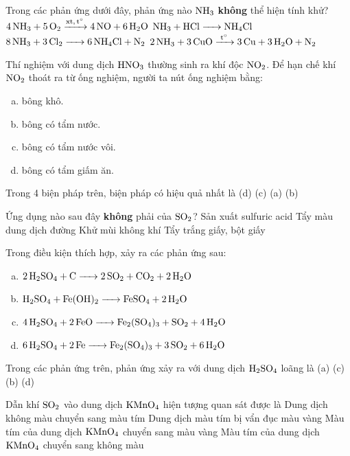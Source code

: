 \documentclass[12pt,a4paper]{article}
\begin{document}
\begin{ex}
Trong các phản ứng dưới đây, phản ứng nào $\ce{NH3}$ \textbf{không} thể hiện tính khử?
\choice
{$\ce{4NH3 + 5O2 ->[xt, t^\circ] 4NO + 6H2O}$}
{\True $\ce{NH3 + HCl -> NH4Cl}$}
{$\ce{8NH3 + 3Cl2 -> 6NH4Cl + N2}$}
{$\ce{2NH3 + 3CuO ->[t^\circ] 3Cu + 3H2O + N2}$}

\end{ex}

\begin{ex}
Thí nghiệm với dung dịch $\ce{HNO3}$ thường sinh ra khí độc $\ce{NO2}$. Để hạn chế khí $\ce{NO2}$ thoát ra từ ống nghiệm, người ta nút ống nghiệm bằng:
\begin{enumerate}[(a)]
	\item bông khô.
	\item bông có tẩm nước.
	\item bông có tẩm nước vôi.
	\item bông có tẩm giấm ăn.
\end{enumerate}
Trong 4 biện pháp trên, biện pháp có hiệu quả nhất là
\choice
{(d)}
{\True (c)}
{(a)}
{(b)}

\end{ex}

\begin{ex}
Ứng dụng nào sau đây \textbf{không} phải của $\ce{SO2}$?
\choice
{Sản xuất sulfuric acid}
{Tẩy màu dung dịch đường}
{\True Khử mùi không khí}
{Tẩy trắng giấy, bột giấy}

\end{ex}

\begin{ex}
Trong điều kiện thích hợp, xảy ra các phản ứng sau:
\begin{enumerate}[(a)]
	\item $\ce{2H2SO4 + C -> 2SO2 + CO2 + 2H2O}$
	\item $\ce{H2SO4 + Fe(OH)2 -> FeSO4 + 2H2O}$
	\item $\ce{4H2SO4 + 2FeO -> Fe2(SO4)3 + SO2 + 4H2O}$
	\item $\ce{6H2SO4 + 2Fe -> Fe2(SO4)3 + 3SO2 + 6H2O}$
\end{enumerate}
Trong các phản ứng trên, phản ứng xảy ra với dung dịch $\ce{H2SO4}$ loãng là
\choice
{(a)}
{(c)}
{\True (b)}
{(d)}

\end{ex}

\begin{ex}
Dẫn khí $\ce{SO2}$ vào dung dịch $\ce{KMnO4}$ hiện tượng quan sát được là
\choice
{Dung dịch không màu chuyển sang màu tím}
{Dung dịch màu tím bị vẩn đục màu vàng}
{Màu tím của dung dịch $\ce{KMnO4}$ chuyển sang màu vàng}
{\True Màu tím của dung dịch $\ce{KMnO4}$ chuyển sang không màu}

\end{ex}
\end{document}
